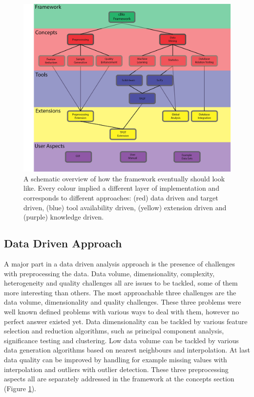 \documentclass[10pt,a4paper]{article}
\begin{document}
	\begin{figure}
		\includegraphics[width=\textwidth]{FrameworkScheme5i5.png}
		\caption{A schematic overview of how the framework eventually should look like. Every colour implied a different layer of implementation and corresponds to different approaches: (red) data driven and target driven, (blue) tool availability driven, (yellow) extension driven and (purple) knowledge driven.}
		\label{fig:FrameworkTree}
	\end{figure}
	
	\subsection{Data Driven Approach}
	\label{subsec:DataDrivenApproach}

	A major part in a data driven analysis approach is the presence of challenges with preprocessing the data. Data volume, dimensionality, complexity, heterogeneity and quality challenges all are issues to be tackled, some of them more interesting than others. The most approachable three challenges are the data volume, dimensionality and quality challenges. These three problems were well known defined problems with various ways to deal with them, however no perfect answer existed yet. Data dimensionality can be tackled by various feature selection and reduction algorithms, such as principal component analysis, significance testing and clustering. Low data volume can be tackled by various data generation algorithms based on nearest neighbours and interpolation. At last data quality can be improved by handling for example missing values with interpolation and outliers with outlier detection. These three preprocessing aspects all are separately addressed in the framework at the concepts section (Figure \ref{fig:FrameworkTree}).
	
\end{document}
